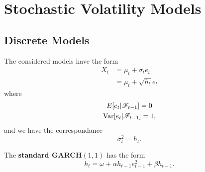 \section{Stochastic Volatility Models}

\subsection{Discrete Models}
\begin{outline}
  \1 The considered models have the form
  \begin{align*}
    X_t &= \mu_t + \sigma_te_t\\
        &= \mu_t + \sqrt{h_t}e_t
  \end{align*}
  where 
  \begin{gather*}
    E[e_t|\mathscr{F}_{t-1}]=0\\
    \operatorname{Var}[e_t|\mathscr{F}_{t-1}] = 1,
  \end{gather*}
  and we have the correspondance
  \begin{equation*}
    \sigma^2_t = h_t.
  \end{equation*}

  \1 The \textbf{standard GARCH$(1,1)$} has the form
  \begin{equation*}
    h_t = \omega + \alpha h_{t-1}e^2_{t-1} + \beta h_{t-1}.
  \end{equation*}
\end{outline}

